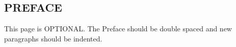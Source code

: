 \begin{doublespace}
\begin{tightcenter}
\section{PREFACE}
\mylinespacing
\end{tightcenter}

This page is OPTIONAL. The Preface should be double spaced and new paragraphs should be indented.  

\mylinespacing
\mylinespacing
\begin{tightcenter}
\myoptpg
\end{tightcenter}
\end{doublespace}